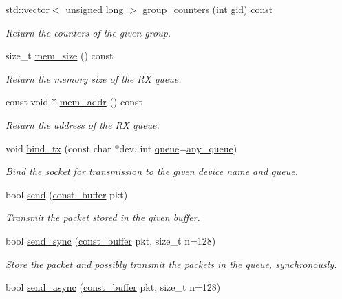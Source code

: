\begin{DoxyCompactItemize}
std\+::vector$<$ unsigned long $>$ \hyperlink{classnet_1_1pfq_a6bf8419e9e400e8a7ffc9d3a6978cfd8}{group\+\_\+counters} (int gid) const 
\begin{DoxyCompactList}\small\item\em Return the counters of the given group. \end{DoxyCompactList}\item 
size\+\_\+t \hyperlink{classnet_1_1pfq_ac25e20f2b2bfd72ef399444337b76459}{mem\+\_\+size} () const 
\begin{DoxyCompactList}\small\item\em Return the memory size of the R\+X queue. \end{DoxyCompactList}\item 
const void $\ast$ \hyperlink{classnet_1_1pfq_a1f16289a4ddffd497ef2dd9c7523bccb}{mem\+\_\+addr} () const 
\begin{DoxyCompactList}\small\item\em Return the address of the R\+X queue. \end{DoxyCompactList}\item 
void \hyperlink{classnet_1_1pfq_a00ba716bc74388ec7facc7c59d92fa6d}{bind\+\_\+tx} (const char $\ast$dev, int \hyperlink{classnet_1_1queue}{queue}=\hyperlink{classnet_1_1pfq_a0d4eca6d0925b7c49365675c9cf9385c}{any\+\_\+queue})
\begin{DoxyCompactList}\small\item\em Bind the socket for transmission to the given device name and queue. \end{DoxyCompactList}\item 
bool \hyperlink{classnet_1_1pfq_a9bd5ed424666bbfc6c54de476b3ee274}{send} (\hyperlink{namespacenet_a05639001760fe5164b163078b5ccc2c0}{const\+\_\+buffer} pkt)
\begin{DoxyCompactList}\small\item\em Transmit the packet stored in the given buffer. \end{DoxyCompactList}\item 
bool \hyperlink{classnet_1_1pfq_adfa55afc44e561314349bf5995c06bae}{send\+\_\+sync} (\hyperlink{namespacenet_a05639001760fe5164b163078b5ccc2c0}{const\+\_\+buffer} pkt, size\+\_\+t n=128)
\begin{DoxyCompactList}\small\item\em Store the packet and possibly transmit the packets in the queue, synchronously. \end{DoxyCompactList}\item 
bool \hyperlink{classnet_1_1pfq_a133184c3a7eee9b8110941436de0a05d}{send\+\_\+async} (\hyperlink{namespacenet_a05639001760fe5164b163078b5ccc2c0}{const\+\_\+buffer} pkt, size\+\_\+t n=128)

\end{DoxyCompactItemize}

